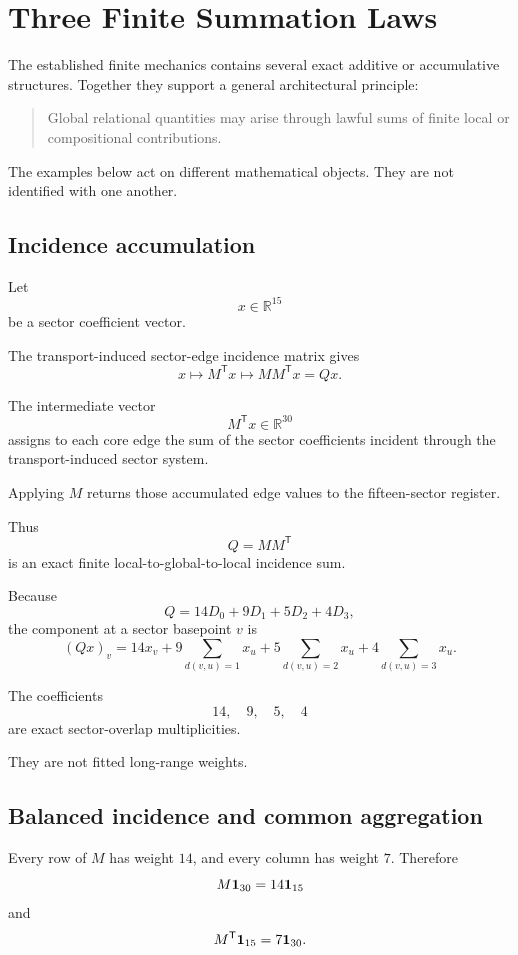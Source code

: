 \section{Three Finite Summation Laws}

The established finite mechanics contains several exact additive or
accumulative structures. Together they support a general architectural
principle:

\begin{quote}
Global relational quantities may arise through lawful sums of finite
local or compositional contributions.
\end{quote}

The examples below act on different mathematical objects. They are
not identified with one another.

\subsection{Incidence accumulation}

Let
\[
x\in\mathbb R^{15}
\]
be a sector coefficient vector.

The transport-induced sector-edge incidence matrix gives
\[
x
\longmapsto
M^{\mathsf T}x
\longmapsto
MM^{\mathsf T}x
=
Qx.
\]

The intermediate vector
\[
M^{\mathsf T}x\in\mathbb R^{30}
\]
assigns to each core edge the sum of the sector coefficients incident
through the transport-induced sector system.

Applying \(M\) returns those accumulated edge values to the
fifteen-sector register.

Thus
\[
Q=MM^{\mathsf T}
\]
is an exact finite local-to-global-to-local incidence sum.

Because
\[
Q
=
14D_0+9D_1+5D_2+4D_3,
\]
the component at a sector basepoint \(v\) is
\[
(Qx)_v
=
14x_v
+
9\sum_{d(v,u)=1}x_u
+
5\sum_{d(v,u)=2}x_u
+
4\sum_{d(v,u)=3}x_u.
\]

The coefficients
\[
14,\quad9,\quad5,\quad4
\]
are exact sector-overlap multiplicities.

They are not fitted long-range weights.

\subsection{Balanced incidence and common aggregation}

Every row of \(M\) has weight \(14\), and every column has weight
\(7\). Therefore
\[
M\mathbf{1}_{30}
=
14\mathbf{1}_{15}
\]
and
\[
M^{\mathsf T}\mathbf{1}_{15}
=
7\mathbf{1}_{30}.
\]


